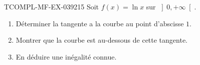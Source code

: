 \begin{exercice}{TCOMPL-MF-EX-039}{2}{15}
Soit $f(x) = \ln x$ sur $\left]0, +\infty\right[$.
\begin{enumerate}
  \item Déterminer la tangente a la courbe au point d'abscisse $1$.
  \item Montrer que la courbe est au-dessous de cette tangente.
  \item En déduire une inégalité connue.
\end{enumerate}

\end{exercice}
